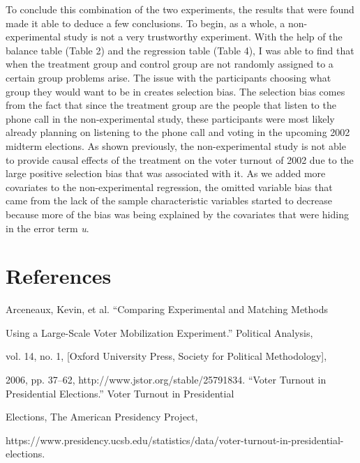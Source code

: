 \documentclass[a4paper]{article}
\begin{document}
To conclude this combination of the two experiments, the results that were found made it able to deduce a few conclusions. To begin, as a whole, a non-experimental study is not a very trustworthy experiment. With the help of the balance table (Table 2) and the regression table (Table 4), I was able to find that when the treatment group and control group are not randomly assigned to a certain group problems arise. The issue with the participants choosing what group they would want to be in creates selection bias. The selection bias comes from the fact that since the treatment group are the people that listen to the phone call in the non-experimental study, these participants were most likely already planning on listening to the phone call and voting in the upcoming 2002 midterm elections. As shown previously, the non-experimental study is not able to provide causal effects of the treatment on the voter turnout of 2002 due to the large positive selection bias that was associated with it. As we added more covariates to the non-experimental regression, the omitted variable bias that came from the lack of the sample characteristic variables started to decrease because more of the bias was being explained by the covariates that were hiding in the error term \textit{u}. 

\newpage

\section{References}

Arceneaux, Kevin, et al. “Comparing Experimental and Matching Methods 
\par
Using a Large-Scale Voter Mobilization Experiment.” Political Analysis, 
\par
 vol. 14, no. 1, [Oxford University Press, Society for Political Methodology], 
 \par
 2006, pp. 37–62, http://www.jstor.org/stable/25791834.
\newline
“Voter Turnout in Presidential Elections.” Voter Turnout in Presidential 
\par
Elections, The American Presidency Project, 
\par
https://www.presidency.ucsb.edu/statistics/data/voter-turnout-in-presidential-elections. 
\end{document}
